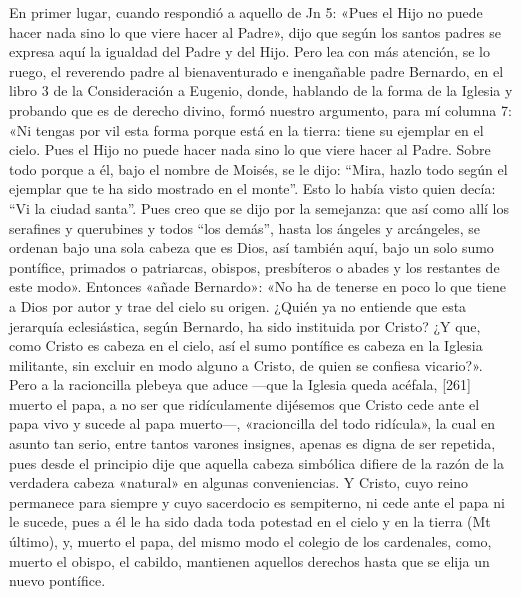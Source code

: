 En primer lugar, cuando respondió a aquello de Jn 5: «Pues el Hijo no puede hacer nada sino lo que viere hacer al Padre», dijo que según los santos padres se expresa aquí la igualdad del Padre y del Hijo. Pero lea con más atención, se lo ruego, el reverendo padre al bienaventurado e inengañable padre Bernardo, en el libro 3 de la Consideración a Eugenio, donde, hablando de la forma de la Iglesia y probando que es de derecho divino, formó nuestro argumento, para mí columna 7: «Ni tengas por vil esta forma porque está en la tierra: tiene su ejemplar en el cielo. Pues el Hijo no puede hacer nada sino lo que viere hacer al Padre. Sobre todo porque a él, bajo el nombre de Moisés, se le dijo: “Mira, hazlo todo según el ejemplar que te ha sido mostrado en el monte”. Esto lo había visto quien decía: “Vi la ciudad santa”. Pues creo que se dijo por la semejanza: que así como allí los serafines y querubines y todos “los demás”, hasta los ángeles y arcángeles, se ordenan bajo una sola cabeza que es Dios, así también aquí, bajo un solo sumo pontífice, primados o patriarcas, obispos, presbíteros o abades y los restantes de este modo». Entonces «añade Bernardo»: «No ha de tenerse en poco lo que tiene a Dios por autor y trae del cielo su origen. ¿Quién ya no entiende que esta jerarquía eclesiástica, según Bernardo, ha sido instituida por Cristo? ¿Y que, como Cristo es cabeza en el cielo, así el sumo pontífice es cabeza en la Iglesia militante, sin excluir en modo alguno a Cristo, de quien se confiesa vicario?». Pero a la racioncilla plebeya que aduce —que la Iglesia queda acéfala, [261] muerto el papa, a no ser que ridículamente dijésemos que Cristo cede ante el papa vivo y sucede al papa muerto—, «racioncilla del todo ridícula», la cual en asunto tan serio, entre tantos varones insignes, apenas es digna de ser repetida, pues desde el principio dije que aquella cabeza simbólica difiere de la razón de la verdadera cabeza «natural» en algunas conveniencias. Y Cristo, cuyo reino permanece para siempre y cuyo sacerdocio es sempiterno, ni cede ante el papa ni le sucede, pues a él le ha sido dada toda potestad en el cielo y en la tierra (Mt último), y, muerto el papa, del mismo modo el colegio de los cardenales, como, muerto el obispo, el cabildo, mantienen aquellos derechos hasta que se elija un nuevo pontífice.

